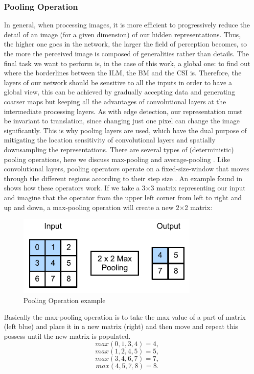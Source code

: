 \documentclass[12pt,a4paper]{scrartcl}
\begin{document}
\subsubsection{Pooling Operation}
In general, when processing images, it is more efficient to progressively reduce the detail of an image (for a given dimension) of our hidden representations. Thus, the higher one goes in the network, the larger the field of perception becomes, so the more the perceived image is composed of generalities rather than details. The final task we want to perform is, in the case of this work, a global one: to find out where the borderlines between the ILM, the BM and the CSI is. Therefore, the layers of our network should be sensitive to all the inputs in order to have a global view, this can be achieved by gradually accepting data and generating coarser maps but keeping all the advantages of convolutional layers at the intermediate processing layers. As with edge detection,  our representation must be invariant to translation, since changing just one pixel can change the image significantly. This is why pooling layers are used, which have the dual purpose of mitigating the location sensitivity of convolutional layers and spatially downsampling the representations. There are several types of (deterministic) pooling operations, here we discuss max-pooling and average-pooling \cite{DFTPooling}. Like convolutional layers, pooling operators operate on a fixed-size-window that moves through the different regions according to their step size \cite{DIDLBook}.
An example found in \cite{DIDLBook} shows how these operators work. If we take a 3$\times$3 matrix representing our input and imagine that the operator from the upper left corner from left to right and up and down, a max-pooling operation will create a new 2$\times$2 matrix: 

\begin{figure}[H]
    \centering
    \includegraphics[width=0.8\textwidth]{./images/pooling_example.png}
    \caption{Pooling Operation example  \cite{DIDLBook}}
\end{figure}
Basically the max-pooling operation is to take the max value of a part of matrix (left blue) and place it in a new matrix (right) and then move and repeat this possess until the new matrix is populated.
\[max(0, 1, 3, 4) = 4,\]
\[max(1, 2, 4, 5) = 5,\]
\[max(3, 4, 6, 7) = 7,\]
\[max(4, 5, 7, 8) = 8.\]
\end{document}
